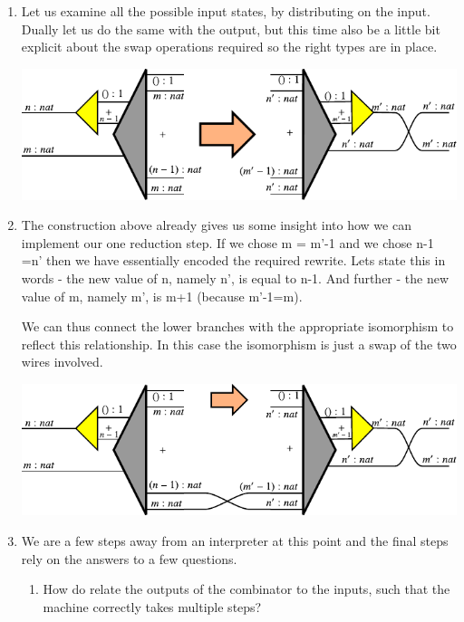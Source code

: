 \documentclass{llncs}
\begin{document}
\begin{enumerate}
\item
Let us examine all the possible input states, by distributing on the
input. Dually let us do the same with the output, but this time also
be a little bit explicit about the swap operations required so the
right types are in place.

\begin{center}
  \includegraphics{diagrams/nat-nat4.pdf}
\end{center}

\item
The construction above already gives us some insight into how we can
implement our one reduction step. If we chose {{m = m'-1}} and we
chose {{n-1 =n'}} then we have essentially encoded the required
rewrite. Lets state this in words - the new value of {{n}}, namely
{{n'}}, is equal to {{n-1}}. And further - the new value of {{m}},
namely {{m'}}, is {{m+1}} (because {{m'-1=m}}). 

We can thus connect the lower branches with the appropriate
isomorphism to reflect this relationship. In this case the isomorphism
is just a swap of the two wires involved.

\begin{center}
  \includegraphics{diagrams/nat-nat5.pdf}
\end{center}

\item
We are a few steps away from an interpreter at this point and the
final steps rely on the answers to a few questions.

\begin{enumerate}
\item How do relate the outputs of the combinator to the inputs, such
  that the machine correctly takes multiple steps?


\end{enumerate}
\end{enumerate}
\end{document}
